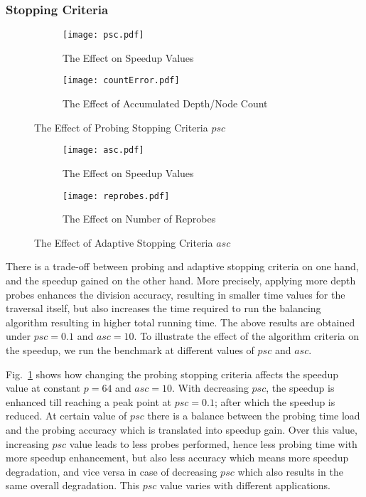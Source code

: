 \documentclass[conference,compsoc]{IEEEtran}
\begin{document}
\subsubsection{Stopping Criteria}
\begin{figure}
	\begin{subfigure}{\columnwidth}
		\centering
		\texttt{[image: psc.pdf]}
		\caption{\label{figPSC}The Effect on Speedup Values}
	\end{subfigure}
	\begin{subfigure}{\columnwidth}
		\centering
		\texttt{[image: countError.pdf]}
		\caption{\label{figCountError}The Effect of Accumulated Depth/Node Count}
	\end{subfigure}
	\caption{The Effect of Probing Stopping Criteria $ \mathit{psc} $}
\end{figure}
\begin{figure}
	\begin{subfigure}{\columnwidth}
		\centering
		\texttt{[image: asc.pdf]}
		\caption{\label{figASC}The Effect on Speedup Values}
	\end{subfigure}
	\begin{subfigure}{\columnwidth}
		\centering
		\texttt{[image: reprobes.pdf]}
		\caption{\label{figReprobes}The Effect on Number of Reprobes}
	\end{subfigure}
	\caption{The Effect of Adaptive Stopping Criteria $ \mathit{asc} $}
\end{figure}
There is a trade-off between probing and adaptive stopping criteria on one hand, and the speedup gained on the other hand. More precisely, applying more depth probes enhances the division accuracy, resulting in smaller time values for the traversal itself, but also increases the time required to run the balancing algorithm resulting in higher total running time. The above results are obtained under $ \mathit{psc} = 0.1 $ and $ \mathit{asc} = 10 $. To illustrate the effect of the algorithm criteria on the speedup, we run the benchmark at different values of $ \mathit{psc} $ and $ \mathit{asc} $.

Fig.~\ref{figPSC} shows how changing the probing stopping criteria affects the speedup value at constant $ p=64 $ and $ \mathit{asc}=10 $. With decreasing $ \mathit{psc} $, the speedup is enhanced till reaching a peak point at $ \mathit{psc} = 0.1 $; after which the speedup is reduced. At certain value of $ \mathit{psc} $ there is a balance between the probing time load and the probing accuracy which is translated into speedup gain. Over this value, increasing $ \mathit{psc} $ value leads to less probes performed, hence less probing time with more speedup enhancement, but also less accuracy which means more speedup degradation, and vice versa in case of decreasing $ \mathit{psc} $ which also results in the same overall degradation. This $ \mathit{psc} $ value varies with different applications. 
\end{document}
